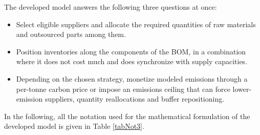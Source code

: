 \documentclass[preprint,12pt,authoryear]{elsarticle}
\begin{document}
The developed model answers the following three questions at once:
\begin{itemize}
    \item Select eligible suppliers and allocate the required quantities of raw materials and outsourced parts among them.
    \item Position inventories along the components of the BOM, in a combination where it does not cost much and does synchronize with supply capacities.
    \item Depending on the chosen strategy, monetize modeled emissions through a per-tonne carbon price or impose an emissions ceiling that can force lower-emission suppliers, quantity reallocations and buffer repositioning.
\end{itemize}
In the following, all the notation used for the mathematical formulation of the developed model is given in Table \ref{tabNot3}.
\begingroup
\small
\setlength{\LTleft}{0pt}
\setlength{\LTright}{0pt}
\end{document}
